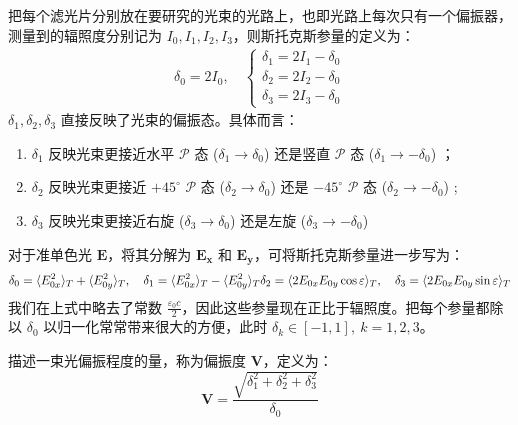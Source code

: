 \documentclass[UTF8]{report}
\theoremstyle{MyLineTheoremStyle} %
\theoremstyle{MyBlockTheoremStyle} %
\theoremstyle{MySubsubsectionStyle} %
\begin{document}
把每个滤光片分别放在要研究的光束的光路上，也即光路上每次只有一个偏振器，测量到的辐照度分别记为 $I_0, I_1, I_2, I_3$，则斯托克斯参量的定义为：
\begin{gather}
\delta_0 = 2I_0,\quad 
\begin{cases}
    \delta_1 = 2I_1 - \delta_0 \\ 
    \delta_2 = 2I_2 - \delta_0 \\ 
    \delta_3 = 2I_3 - \delta_0 
\end{cases}
\end{gather}
$\delta_1, \delta_2, \delta_3$ 直接反映了光束的偏振态。具体而言：
\begin{enumerate}
\item $\delta_1$ 反映光束更接近水平 $\mathscr{P}$ 态 ($\delta_1 \to \delta_0$) 还是竖直 $\mathscr{P}$ 态 ($\delta_1 \to -\delta_0$) ；
\item $\delta_2$ 反映光束更接近 $+45^\circ$ $\mathscr{P}$ 态 ($\delta_2 \to \delta_0$) 还是 $-45^\circ$ $\mathscr{P}$ 态 ($\delta_2 \to -\delta_0$) ;
\item $\delta_3$ 反映光束更接近右旋 ($\delta_3 \to \delta_0$) 还是左旋 ($\delta_3 \to -\delta_0$) 
\end{enumerate}
对于准单色光 $\boldsymbol{E}$，将其分解为 $\boldsymbol{E_x}$ 和 $\boldsymbol{E_y}$，可将斯托克斯参量进一步写为：
\begin{equation}
    \delta_0 = \langle E_{0x}^2 \rangle_T + \langle E_{0y}^2 \rangle_T ,\quad 
    \delta_1 = \langle E_{0x}^2 \rangle_T - \langle E_{0y}^2 \rangle_T \\ 
    \delta_2 = \langle 2 E_{0x}E_{0y} \cos \varepsilon \rangle_T ,\quad 
    \delta_3 = \langle 2 E_{0x}E_{0y} \sin \varepsilon \rangle_T 
\end{equation}
我们在上式中略去了常数 $\frac{\varepsilon_0c}{2}$，因此这些参量现在正比于辐照度。把每个参量都除以 $\delta_0$ 以归一化常常带来很大的方便，此时 $\delta_{k} \in [-1, 1], \ k = 1, 2, 3$。

描述一束光偏振程度的量，称为偏振度 $\mathbf{V}$，定义为：
\begin{equation}
\mathbf{V} = \frac{\sqrt{\delta_1^2 + \delta_2^2 + \delta_3^2}}{\delta_0}
\end{equation}
\end{document}
